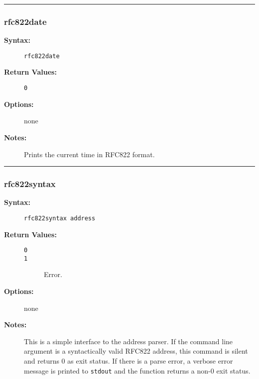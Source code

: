 \hrule
\subsubsection{rfc822date}

\begin{description}
\item[{\bf Syntax:}] \mbox{}

{\tt rfc822date}

\item[{\bf Return Values:}] \mbox{}

\begin{description}
\item[{\tt 0}] \mbox{}



\end{description}


\item[{\bf Options:}] \mbox{}

none

\item[{\bf Notes:}] \mbox{}

Prints the current time in RFC822 format. 

\end{description}


\hrule
\subsubsection{rfc822syntax}

\begin{description}
\item[{\bf Syntax:}] \mbox{}

{\tt rfc822syntax address}

\item[{\bf Return Values:}] \mbox{}

\begin{description}
\item[{\tt 0}] \mbox{}



\item[{\tt 1}] \mbox{}

Error.

\end{description}


\item[{\bf Options:}] \mbox{}

none  

\item[{\bf Notes:}] \mbox{}

This is a simple interface to the address 
parser. If the command line argument is a syntactically valid 
RFC822 address, this command is silent and returns 0 as exit 
status. If there is a parse error, a verbose error message is 
printed to {\tt stdout} and the function returns a non-0 
exit status. 

\end{description}


